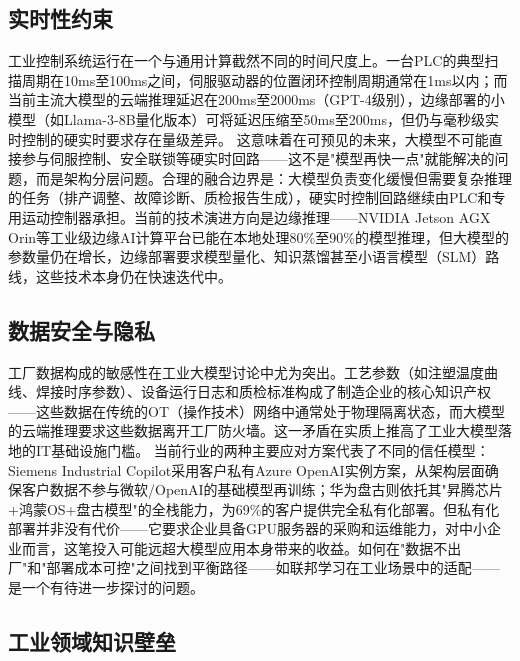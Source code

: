 \documentclass[12pt,a4paper]{ctexart}
\begin{document}
\subsection{实时性约束}

工业控制系统运行在一个与通用计算截然不同的时间尺度上。一台PLC的典型扫描周期在10ms至100ms之间，伺服驱动器的位置闭环控制周期通常在1ms以内；而当前主流大模型的云端推理延迟在200ms至2000ms（GPT-4级别），边缘部署的小模型（如Llama-3-8B量化版本）可将延迟压缩至50ms至200ms，但仍与毫秒级实时控制的硬实时要求存在量级差异。\cite{jms2025llmindustry5} 这意味着在可预见的未来，大模型不可能直接参与伺服控制、安全联锁等硬实时回路——这不是"模型再快一点"就能解决的问题，而是架构分层问题。合理的融合边界是：大模型负责变化缓慢但需要复杂推理的任务（排产调整、故障诊断、质检报告生成），硬实时控制回路继续由PLC和专用运动控制器承担。当前的技术演进方向是边缘推理——NVIDIA Jetson AGX Orin等工业级边缘AI计算平台已能在本地处理80\%至90\%的模型推理\cite{jisem2025cvzerodefect}，但大模型的参数量仍在增长，边缘部署要求模型量化、知识蒸馏甚至小语言模型（SLM）路线，这些技术本身仍在快速迭代中。

\subsection{数据安全与隐私}

工厂数据构成的敏感性在工业大模型讨论中尤为突出。工艺参数（如注塑温度曲线、焊接时序参数）、设备运行日志和质检标准构成了制造企业的核心知识产权——这些数据在传统的OT（操作技术）网络中通常处于物理隔离状态，而大模型的云端推理要求这些数据离开工厂防火墙。这一矛盾在实质上推高了工业大模型落地的IT基础设施门槛。\cite{ieee2024llmindustrial} 当前行业的两种主要应对方案代表了不同的信任模型：Siemens Industrial Copilot采用客户私有Azure OpenAI实例方案，从架构层面确保客户数据不参与微软/OpenAI的基础模型再训练\cite{siemens2024press}；华为盘古则依托其"昇腾芯片+鸿蒙OS+盘古模型"的全栈能力，为69\%的客户提供完全私有化部署\cite{huawei2025pangu}。但私有化部署并非没有代价——它要求企业具备GPU服务器的采购和运维能力，对中小企业而言，这笔投入可能远超大模型应用本身带来的收益。如何在"数据不出厂"和"部署成本可控"之间找到平衡路径——如联邦学习在工业场景中的适配——是一个有待进一步探讨的问题。\cite{jms2025llmindustry5}

\subsection{工业领域知识壁垒}
\end{document}

